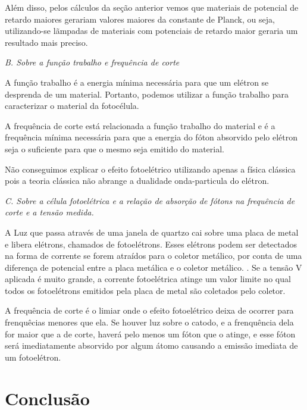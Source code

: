 \documentclass[10pt,twocolumn,letterpaper]{article}
\begin{document}
\hspace{1cm} Além disso, pelos cálculos da seção anterior vemos que materiais de potencial de retardo maiores gerariam valores maiores da constante de Planck, ou seja, utilizando-se lãmpadas de materiais com potenciais de retardo maior geraria um resultado mais preciso.

\noindent\textit{B. Sobre a função trabalho e frequência de corte}

\hspace{1cm} A função trabalho é a energia mínima necessária para que um elétron se desprenda de um material. Portanto, podemos utilizar a função trabalho para caracterizar o material da fotocélula.

\hspace{1cm} A frequência de corte está relacionada a função trabalho do material e é a frequência mínima necessária para que a energia do fóton absorvido pelo elétron seja o suficiente para que o mesmo seja emitido do material.

\hspace{1cm} Não conseguimos explicar o efeito fotoelétrico utilizando apenas a física clássica pois a teoria clássica não abrange a dualidade onda-particula do elétron.

\noindent\textit{C. Sobre a célula fotoelétrica e a relação de absorção de
fótons na frequência de corte e a tensão medida.}

\hspace{1cm} A Luz que passa através de uma janela de quartzo cai sobre uma placa de metal e libera elétrons, chamados de fotoelétrons. Esses elétrons podem ser detectados na forma de corrente se forem atraídos para o coletor metálico, por conta de uma diferença de potencial entre a placa metálica e o coletor metálico. . Se a tensão V aplicada é muito grande, a corrente fotoelétrica atinge um valor limite no qual todos os fotoelétrons emitidos pela placa de metal são coletados pelo coletor.

\hspace{1cm} A frequência de corte é o limiar onde o efeito fotoelétrico deixa de ocorrer para frenquêcias menores que ela. Se houver luz sobre o catodo, e a frenquência dela for maior que a de corte, haverá pelo menos um fóton que o atinge, e esse fóton será imediatamente absorvido por algum átomo causando a emissão imediata de um fotoelétron.


\section{Conclusão}
\end{document}
